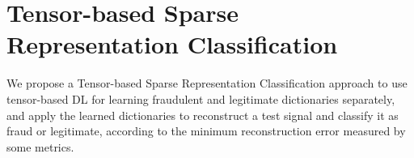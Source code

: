 





\section{Tensor-based Sparse Representation Classification}
\label{sec:4_proposal}

We propose a Tensor-based Sparse Representation Classification approach to use tensor-based DL for learning fraudulent and legitimate dictionaries separately, and apply the learned dictionaries to reconstruct a test signal and classify it as fraud or legitimate, according to the minimum reconstruction error measured by some metrics.

